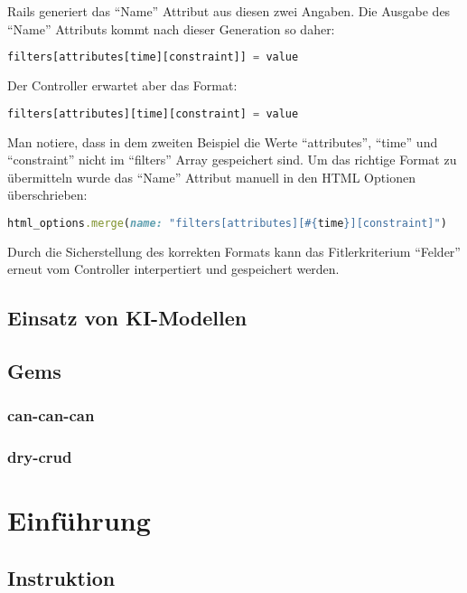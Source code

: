 Rails generiert das ``Name'' Attribut aus diesen zwei Angaben. Die Ausgabe des ``Name'' Attributs kommt nach dieser 
Generation so daher: 
\newline

\begin{lstlisting}[language=Javascript]
    filters[attributes[time][constraint]] = value
\end{lstlisting}

Der Controller erwartet aber das Format:
\newline

\begin{lstlisting}[language=Javascript]
   filters[attributes][time][constraint] = value
\end{lstlisting}

Man notiere, dass in dem zweiten Beispiel die Werte ``attributes'', ``time'' und ``constraint'' nicht
im ``filters'' Array gespeichert sind.
Um das richtige Format zu übermitteln wurde das ``Name'' Attribut manuell in den HTML Optionen überschrieben:
\newline

\begin{lstlisting}[language=Ruby]
   html_options.merge(name: "filters[attributes][#{time}][constraint]")
\end{lstlisting}

Durch die Sicherstellung des korrekten Formats kann das Fitlerkriterium ``Felder'' erneut vom Controller interpertiert und 
gespeichert werden.

\section{Einsatz von KI-Modellen}
\section{Gems}
\subsection{can-can-can}
\subsection{dry-crud}

\chapter{Einführung}

\section{Instruktion}

